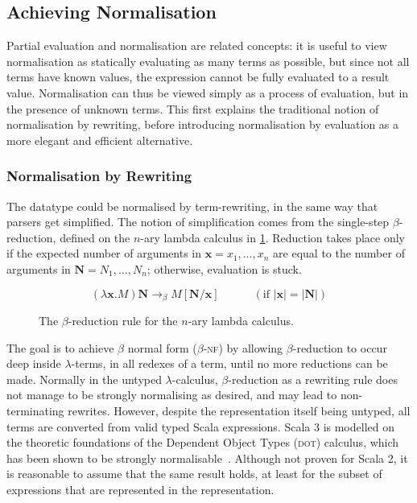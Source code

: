 \documentclass[../../main.tex]{subfiles}
\begin{document}
\subsection{Achieving Normalisation}\label{sec:normalisation-approach}
Partial evaluation and normalisation are related concepts: it is useful to view normalisation as statically evaluating as many terms as possible, but since not all terms have known values, the expression cannot be fully evaluated to a result value.
Normalisation can thus be viewed simply as a process of evaluation, but in the presence of unknown terms.
This  first explains the traditional notion of normalisation by rewriting, before introducing normalisation by evaluation as a more elegant and efficient alternative.

\subsubsection{Normalisation by Rewriting}
The  datatype could be normalised by term-rewriting, in the same way that parsers get simplified.
The notion of simplification comes from the single-step $\beta$-reduction, defined on the $n$-ary lambda calculus in \cref{fig:beta-reduction}.
Reduction takes place only if the expected number of arguments in $\mathbf{x} = x_1, \ldots, x_n$ are equal to the number of arguments in $\mathbf{N} = N_1, \ldots, N_n$; otherwise, evaluation is stuck.

\begin{figure}[htbp]
\begin{equation*}
(\lambda \mathbf{x} . M) \mathbf{N} \rightarrow_\beta M[\mathbf{N}/\mathbf{x}] \hspace{3em} (\text{if } | \mathbf{x} | = | \mathbf{N} | )
\end{equation*}
\caption{The $\beta$-reduction rule for the $n$-ary lambda calculus.}
\label{fig:beta-reduction}
\end{figure}

The goal is to achieve $\beta$ normal form ($\beta$-\textsc{nf}) by allowing $\beta$-reduction to occur deep inside $\lambda$-terms, in all redexes of a term, until no more reductions can be made.
Normally in the untyped $\lambda$-calculus, $\beta$-reduction as a rewriting rule does not manage to be strongly normalising as desired, and may lead to non-terminating rewrites.
However, despite the  representation itself being untyped, all  terms are converted from valid typed Scala expressions.
Scala 3 is modelled on the theoretic foundations of the Dependent Object Types (\textsc{dot}) calculus, which has been shown to be strongly normalisable~\cite{wang_strong_2017}.
Although not proven for Scala 2, it is reasonable to assume that the same result holds, at least for the subset of expressions that are represented in the  representation.
\end{document}
